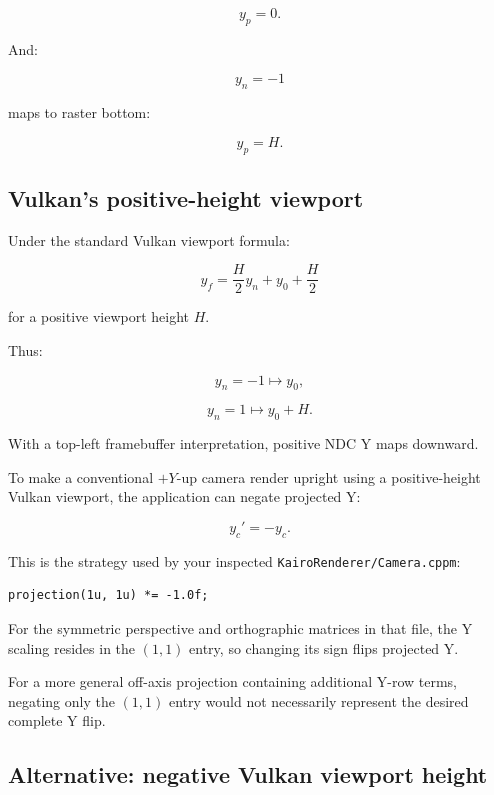 \[
 y_p=0.
\]

And:

\[
 y_n=-1
\]

maps to raster bottom:

\[
 y_p=H.
\]

\subsection{Vulkan's positive-height viewport}\label{02-foundations-ii-ch033-vulkans-positive-height-viewport}

\hypertarget{02-foundations-ii-ch033-vulkans-positive-height-viewport}{}

Under the standard Vulkan viewport formula:

\[
 y_f=\frac{H}{2}y_n+y_0+\frac H2
\]

for a positive viewport height \(H\).

Thus:

\[
 y_n=-1\mapsto y_0,
\]

\[
 y_n=1\mapsto y_0+H.
\]

With a top-left framebuffer interpretation, positive NDC Y maps downward.

To make a conventional \(+Y\)-up camera render upright using a positive-height Vulkan viewport, the application can negate projected Y:

\[
 \boxed{ y_c'=-y_c }.
\]

This is the strategy used by your inspected \texttt{KairoRenderer/Camera.cppm}:

\begin{verbatim}
projection(1u, 1u) *= -1.0f;
\end{verbatim}

For the symmetric perspective and orthographic matrices in that file, the Y scaling resides in the \((1,1)\) entry, so changing its sign flips projected Y.

For a more general off-axis projection containing additional Y-row terms, negating only the \((1,1)\) entry would not necessarily represent the desired complete Y flip.

\subsection{Alternative: negative Vulkan viewport height}\label{02-foundations-ii-ch033-alternative-negative-vulkan-viewport-height}

\hypertarget{02-foundations-ii-ch033-alternative-negative-vulkan-viewport-height}{}

